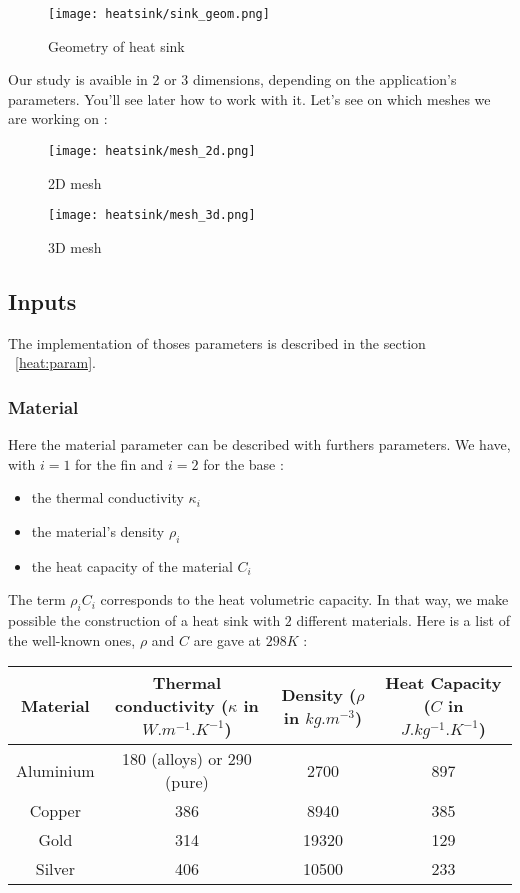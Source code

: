 \begin{figure}[!h]
\centering
\texttt{[image: heatsink/sink\_geom.png]}
\caption{Geometry of heat sink}
\end{figure}

Our study is avaible in 2 or 3 dimensions, depending on the application's parameters. You'll see later how to work with it. Let's see on which meshes we are working on :
\begin{figure}[!h]
\begin{minipage}[b]{.50\linewidth}
\centering
\texttt{[image: heatsink/mesh\_2d.png]}
\caption{2D mesh}
\end{minipage}
\begin{minipage}[b]{.50\linewidth}
\centering
\texttt{[image: heatsink/mesh\_3d.png]}
\caption{3D mesh}
\end{minipage}
\end{figure}

\subsection{Inputs}
The implementation of thoses parameters is described in the section ~\ref{heat:param}.

\subsubsection{Material}

Here the material parameter can be described with furthers parameters. We have, with $i=1$ for the fin and $i=2$ for the base :
\begin{itemize}
\item the thermal conductivity $\kappa_i$

\item the material's density $\rho_i$

\item the heat capacity of the material $C_i$

\end{itemize}
The term $\rho_i C_i$ corresponds to the heat volumetric capacity. In that way, we make possible the construction of a heat sink with $2$ different materials. Here is a list of the well-known ones, $\rho$ and $C$ are gave at $298 K$ :

\begin{center}
\begin{tabular}{|c|c|c|c|}
  \hline
  \textbf{Material} & \textbf{Thermal conductivity} ($\kappa$ in $W.m^{-1}.K^{-1}$) & \textbf{Density }($\rho$ in $kg.m^{-3}$) & \textbf{Heat Capacity} ($C$ in $J.kg^{-1}.K^{-1}$) \\
  \hline
  Aluminium & 180 (alloys) or 290 (pure) & 2700 & 897 \\
  \hline
  Copper & 386 & 8940 & 385 \\
  \hline
  Gold & 314 & 19320 & 129 \\
  \hline
  Silver & 406 & 10500 & 233 \\
  \hline
\end{tabular}
\end{center}

